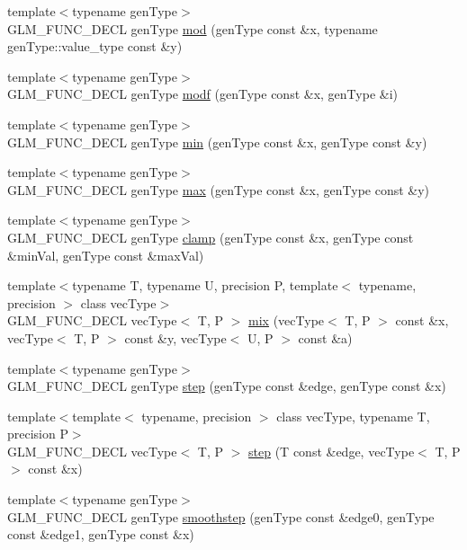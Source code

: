 \begin{CompactItemize}
\item 
{\footnotesize template$<$typename genType$>$ }\\GLM\_\-FUNC\_\-DECL genType \hyperlink{group__core__func__common_ge03755d98416b59e5d791665c6b6895a}{mod} (genType const \&x, typename genType::value\_\-type const \&y)
\item 
{\footnotesize template$<$typename genType$>$ }\\GLM\_\-FUNC\_\-DECL genType \hyperlink{group__core__func__common_gcc8db4cd1d86780898c8b12e465eecf4}{modf} (genType const \&x, genType \&i)
\item 
{\footnotesize template$<$typename genType$>$ }\\GLM\_\-FUNC\_\-DECL genType \hyperlink{group__core__func__common_g7c4425eacc9498bb2ab8a7cfd662cd69}{min} (genType const \&x, genType const \&y)
\item 
{\footnotesize template$<$typename genType$>$ }\\GLM\_\-FUNC\_\-DECL genType \hyperlink{group__core__func__common_g4e4d7b280fec55e5dfeb1367a1a2597d}{max} (genType const \&x, genType const \&y)
\item 
{\footnotesize template$<$typename genType$>$ }\\GLM\_\-FUNC\_\-DECL genType \hyperlink{group__core__func__common_g8b4808983e20c4c74b20e0a025787ab4}{clamp} (genType const \&x, genType const \&minVal, genType const \&maxVal)
\item 
{\footnotesize template$<$typename T, typename U, precision P, template$<$ typename, precision $>$ class vecType$>$ }\\GLM\_\-FUNC\_\-DECL vecType$<$ T, P $>$ \hyperlink{group__core__func__common_gc208863c09fe827a44c976cc6d2aee33}{mix} (vecType$<$ T, P $>$ const \&x, vecType$<$ T, P $>$ const \&y, vecType$<$ U, P $>$ const \&a)
\item 
{\footnotesize template$<$typename genType$>$ }\\GLM\_\-FUNC\_\-DECL genType \hyperlink{group__core__func__common_gcc889b24788725c04a80e29f6cc62c1e}{step} (genType const \&edge, genType const \&x)
\item 
{\footnotesize template$<$template$<$ typename, precision $>$ class vecType, typename T, precision P$>$ }\\GLM\_\-FUNC\_\-DECL vecType$<$ T, P $>$ \hyperlink{group__core__func__common_gdb27417a05ff516eda338a7047cea913}{step} (T const \&edge, vecType$<$ T, P $>$ const \&x)
\item 
{\footnotesize template$<$typename genType$>$ }\\GLM\_\-FUNC\_\-DECL genType \hyperlink{group__core__func__common_gcd449790122dcacf69b7e8a53f97fdd8}{smoothstep} (genType const \&edge0, genType const \&edge1, genType const \&x)

\end{CompactItemize}
